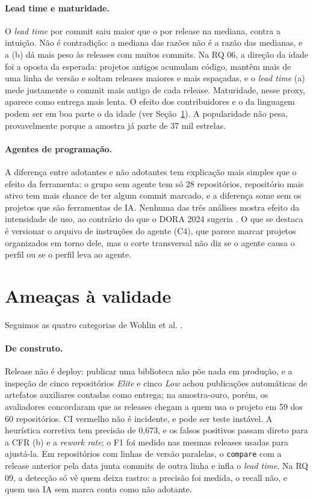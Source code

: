 \documentclass[12pt]{article}
\begin{document}
\paragraph{Lead time e maturidade.} O \textit{lead time} por commit saiu maior que o por release na
mediana, contra a intuição. Não é contradição: a mediana das razões não é a razão das medianas, e a
(b) dá mais peso às releases com muitos commits. Na RQ 06, a direção da idade foi a oposta da
esperada: projetos antigos acumulam código, mantêm mais de uma linha de versão e soltam releases
maiores e mais espaçadas, e o \textit{lead time} (a) mede justamente o commit mais antigo de cada
release. Maturidade, nesse proxy, aparece como entrega mais lenta. O efeito dos contribuidores e o da
linguagem podem ser em boa parte o da idade (ver Seção~\ref{sec:ameacas}). A popularidade não pesa,
provavelmente porque a amostra já parte de 37 mil estrelas.

\paragraph{Agentes de programação.} A diferença entre adotantes e não adotantes tem explicação mais
simples que o efeito da ferramenta: o grupo sem agente tem só 28 repositórios, repositório mais ativo
tem mais chance de ter algum commit marcado, e a diferença some sem os projetos que são ferramentas de
IA. Nenhuma das três análises mostra efeito da intensidade de uso, ao contrário do que o DORA 2024
sugeria \cite{dora2024}. O que se destaca é versionar o arquivo de instruções do agente (C4), que
parece marcar projetos organizados em torno dele, mas o corte transversal não diz se o agente causa o
perfil ou se o perfil leva ao agente.

\section{Ameaças à validade}
\label{sec:ameacas}

Seguimos as quatro categorias de Wohlin et al. \cite{wohlin2012experimentation}.

\paragraph{De construto.} Release não é deploy: publicar uma biblioteca não põe nada em produção, e
a inspeção de cinco repositórios \textit{Elite} e cinco \textit{Low} achou publicações automáticas de
artefatos auxiliares contadas como entrega; na amostra-ouro, porém, os avaliadores concordaram que as
releases chegam a quem usa o projeto em 59 dos 60 repositórios. CI vermelho não é incidente, e pode ser teste instável. A
heurística corretiva tem precisão de 0,673, e os falsos positivos passam direto para a CFR (b) e a
\textit{rework rate}; o F1 foi medido nas mesmas releases usadas para ajustá-la. Em repositórios com
linhas de versão paralelas, o \texttt{compare} com a release anterior pela data junta commits de
outra linha e infla o \textit{lead time}. Na RQ 09, a detecção só vê quem deixa rastro: a precisão foi
medida, o recall não, e quem usa IA sem marca conta como não adotante.
\end{document}
